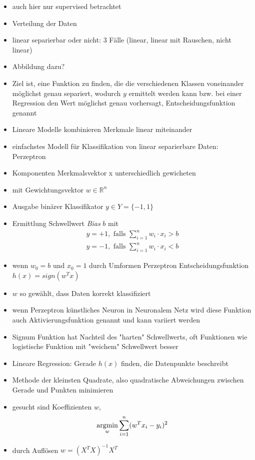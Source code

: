 	\begin{itemize}
		\item auch hier nur supervised betrachtet
		\item Verteilung der Daten
		\item linear separierbar oder nicht: 3 Fälle (linear, linear mit Rauschen, nicht linear)
		\item Abbildung dazu?
		\item Ziel ist, eine Funktion zu finden, die die verschiedenen Klassen voneinander möglichst genau separiert, wodurch $y$ ermittelt werden kann bzw. bei einer Regression den Wert möglichst genau vorhersagt, Entscheidungsfunktion genannt
		\item Lineare Modelle kombinieren Merkmale linear miteinander
		\item einfachstes Modell für Klassifikation von linear separierbare Daten: Perzeptron
		\item Komponenten Merkmalsvektor x unterschiedlich gewicheten
		\item mit Gewichtungsvektor $w \in \mathbb{R}^n$
		\item Ausgabe binärer Klassifikator $y \in Y = \{-1, 1\}$
		\item Ermittlung Schwellwert \textit{Bias} $b$ mit \[
\begin{gathered}
	y = +1, \text{ falls } \sum_{i=1}^{n} w_i \cdot x_i > b \\
	y = -1, \text{ falls } \sum_{i=1}^{n} w_i \cdot x_i < b
\end{gathered}
\]
		\item wenn $w_0 = b$ und $x_0 =1$ durch Umformen Perzeptron Entscheidungsfunktion $h(x) = sign(w^Tx)$
		\item $w$ so gewählt, dass Daten korrekt klassifiziert
		\item wenn Perzeptron künstliches Neuron in Neuronalem Netz wird diese Funktion auch Aktivierungsfunktion genannt und kann variiert werden
		\item Signum Funktion hat Nachteil des "harten" Schwellwerts, oft Funktionen wie logistische Funktion mit "weichem" Schwellwert besser
		\item Lineare Regression: Gerade $h(x)$ finden, die Datenpunkte beschreibt
		\item Methode der kleinsten Quadrate, also quadratische Abweichungen zwischen Gerade und Punkten minimieren
		\item gesucht sind Koeffizienten $w$, \[\operatorname*{argmin}_w \sum_{i=1}^{n} (w^T x_i - y_i)^2\]
		\item durch Auflösen $w = (X^T X)^{-1} X^T$

\end{itemize}
